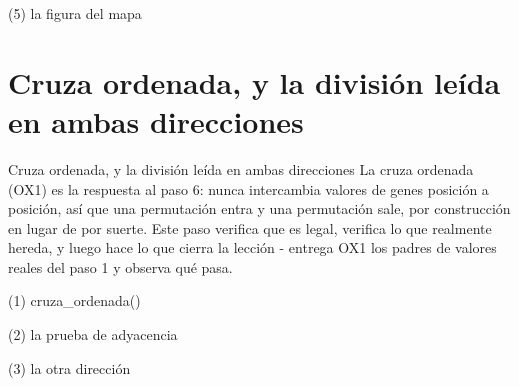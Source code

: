 \begin{frame}[fragile]{(5) la figura del mapa}

\end{frame}


\section{Cruza ordenada, y la división leída en ambas direcciones}

\begin{frame}{Cruza ordenada, y la división leída en ambas direcciones}
La cruza ordenada (OX1) es la respuesta al paso 6: nunca intercambia valores de genes
posición a posición, así que una permutación entra y una permutación sale, por
construcción en lugar de por suerte. Este paso verifica que es legal, verifica lo que
realmente hereda, y luego hace lo que cierra la lección - entrega OX1 los padres de
valores reales del paso 1 y observa qué pasa.
\end{frame}

\begin{frame}[fragile]{(1) cruza\_ordenada()}

\end{frame}

\begin{frame}[fragile]{(2) la prueba de adyacencia}

\end{frame}

\begin{frame}[fragile]{(3) la otra dirección}

\end{frame}

